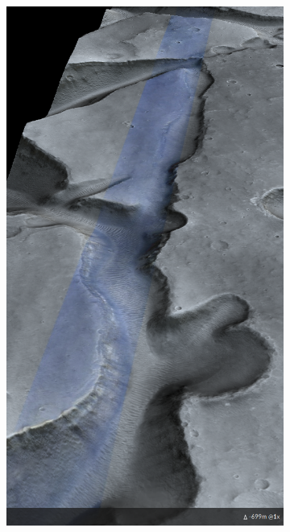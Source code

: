 \begin{figure}[h]
\captionsetup[subfigure]{justification=centering}
\vspace{-2ex}
	\centering
    \setlength{\subfigureWidth}{0.50\textwidth}
    \setlength{\graphicsHeight}{130mm}
    \hypersetup{hidelinks=true}%
    \begin{subfigure}[t]{\subfigureWidth}
        \centering
        \includegraphics[height=\graphicsHeight]{sections/mars-solar-energy/mission-sites/images/western-iani-chaos-dtm.png}

\end{subfigure}
\end{figure}
